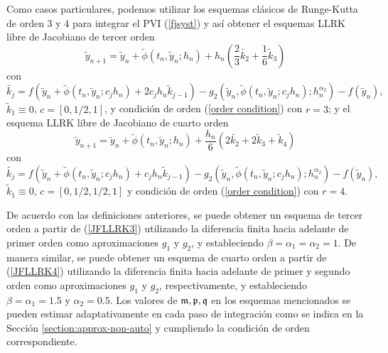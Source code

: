 Como casos particulares, podemos utilizar los esquemas clásicos de Runge-Kutta de orden 3 y 4 para integrar el PVI (\ref{fjsyst}) y así obtener el esquemas LLRK libre de Jacobiano de tercer orden
\begin{equation}
    \widetilde{y}_{n+1}=\widetilde{y}_n+\widetilde{\phi}(t_n,\widetilde{y}_n;h_n) + h_n(\frac{2}{3}\widetilde{k_2}+\frac{1}{6}\widetilde{k}_3) \label{JFLLRK3}
\end{equation}
con
\begin{equation*}
    \widetilde{k_j}=f(\widetilde{y}_n+\widetilde{\phi}(t_n,\widetilde{y}_n;c_jh_n)+2c_jh_n\widetilde{k}_{j-1})-g_2(\widetilde{y}_n,\widetilde{\phi}(t_n,\widetilde{y}_n;c_jh_n);h^{\alpha_2}_n)-f(\widetilde{y}_n),
\end{equation*}
$\widetilde{k}_1\equiv 0$, $c=[0,1/2,1]$, y condición de orden  (\ref{order condition}) con $r=3$; y el esquema LLRK libre de Jacobiano de cuarto orden
\begin{equation}
    \widetilde{y}_{n+1}=\widetilde{y}_n+\widetilde{\phi}(t_n,\widetilde{y}_n;h_n) + \frac{h_n}{6}(2\widetilde{k_2}+2\widetilde{k}_3+\widetilde{k}_4) \label{JFLLRK4}
\end{equation}
con
\begin{equation*}
    \widetilde{k_j}=f(\widetilde{y}_n+\widetilde{\phi}(t_n,\widetilde{y}_n;c_jh_n)+c_jh_n\widetilde{k}_{j-1})-g_2(\widetilde{y}_n,\widetilde{\phi}(t_n,\widetilde{y}_n;c_jh_n);h^{\alpha_2}_n)-f(\widetilde{y}_n),
\end{equation*}
$\widetilde{k}_1\equiv 0$, $c=[0,1/2,1/2,1]$ y condición de orden  (\ref{order condition}) con $r=4$.

De acuerdo con las definiciones anteriores, se puede obtener un esquema de tercer orden a partir de (\ref{JFLLRK3}) utilizando la diferencia finita hacia adelante de primer orden como aproximaciones $g_1$ y $g_2$, y estableciendo $\beta=\alpha_1 =\alpha_2=1$. De manera similar, se puede obtener un esquema de cuarto orden a partir de (\ref{JFLLRK4}) utilizando la diferencia finita hacia adelante de primer y segundo orden como aproximaciones $g_1$ y $g_2$, respectivamente, y estableciendo $\beta= \alpha_1=1\mathord{.}5$ y $\alpha_2=0\mathord{.}5$. Los valores de $\mathfrak{m},\mathfrak{p},\mathfrak{q}$ en los esquemas mencionados se pueden estimar adaptativamente en cada paso de integración como se indica en la Sección \ref{section:approx-non-auto} y cumpliendo la condición de orden correspondiente.

